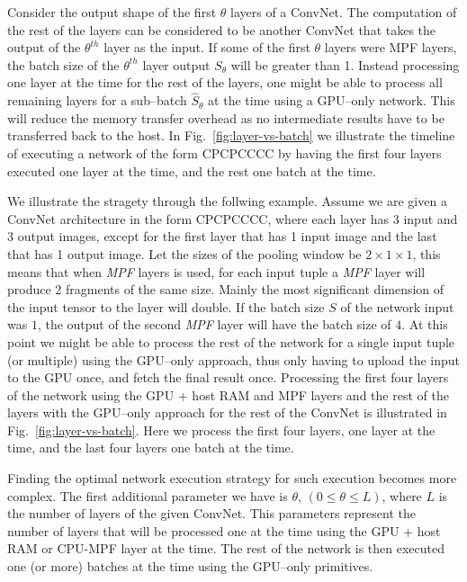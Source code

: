 \documentclass[conference]{./IEEEtran/IEEEtran}
\begin{document}
  Consider the output shape of the first $\theta$ layers of a ConvNet.
  The computation of the rest of the layers can be considered to be
  another ConvNet that takes the output of the $\theta^{th}$ layer as
  the input.  If some of the first $\theta$ layers were MPF layers,
  the batch size of the $\theta^{th}$ layer output $S_{\theta}$ will
  be greater than 1.  Instead processing one layer at the time for the
  rest of the layers, one might be able to process all remaining
  layers for a sub--batch $\hat{S}_{\theta}$ at the time using a
  GPU--only network.  This will reduce the memory transfer overhead as
  no intermediate results have to be transferred back to the host.  In
  Fig.~\ref{fig:layer-vs-batch} we illustrate the timeline of
  executing a network of the form CPCPCCCC by having the first four
  layers executed one layer at the time, and the rest one batch at the
  time.

We illustrate the stragety through
  the follwing example.  Assume we are given a ConvNet architecture in
  the form CPCPCCCC, where each layer has 3 input and 3 output images,
  except for the first layer that has 1 input image and the last that
  has 1 output image.  Let the sizes of the pooling window be $2
  \times 1 \times 1$, this means that when \emph{MPF} layers is used,
  for each input tuple a \emph{MPF} layer will produce 2 fragments of
  the same size.  Mainly the most significant dimension of the input
  tensor to the layer will double.  If the batch size $S$ of the
  network input was $1$, the output of the second \emph{MPF} layer
  will have the batch size of $4$.  At this point we might be able to
  process the rest of the network for a single input tuple (or
  multiple) using the GPU--only approach, thus only having to upload
  the input to the GPU once, and fetch the final result once.
  Processing the first four layers of the network using the GPU + host
  RAM and MPF layers and the rest of the layers with the GPU--only
  approach for the rest of the ConvNet is illustrated in
  Fig.~\ref{fig:layer-vs-batch}.  Here we process the first four
  layers, one layer at the time, and the last four layers one batch at
  the time.

  Finding the optimal network execution strategy for such execution
  becomes more complex.  The first additional parameter we have is
  $\theta$, $(0 \le \theta \le L)$, where $L$ is the number of layers
  of the given ConvNet.  This parameters represent the number of
  layers that will be processed one at the time using the GPU + host
  RAM or CPU-MPF layer at the time.  The rest of the network is then
  executed one (or more) batches at the time using the GPU--only
  primitives.
\end{document}
